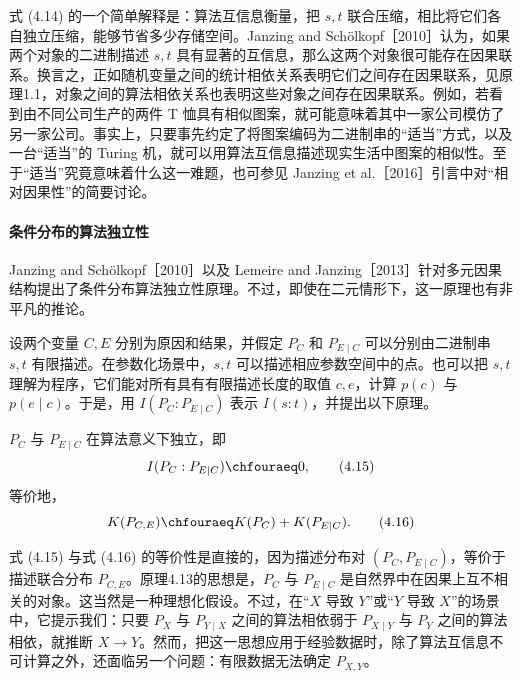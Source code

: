 式 (4.14) 的一个简单解释是：算法互信息衡量，把 $s,t$ 联合压缩，相比将它们各自独立压缩，能够节省多少存储空间。Janzing and Schölkopf［2010］认为，如果两个对象的二进制描述 $s,t$ 具有显著的互信息，那么这两个对象很可能存在因果联系。换言之，正如随机变量之间的统计相依关系表明它们之间存在因果联系，见原理1.1，对象之间的算法相依关系也表明这些对象之间存在因果联系。例如，若看到由不同公司生产的两件 T 恤具有相似图案，就可能意味着其中一家公司模仿了另一家公司。事实上，只要事先约定了将图案编码为二进制串的“适当”方式，以及一台“适当”的 Turing 机，就可以用算法互信息描述现实生活中图案的相似性。至于“适当”究竟意味着什么这一难题，也可参见 Janzing et al.［2016］引言中对“相对因果性”的简要讨论。

\paragraph{条件分布的算法独立性}
Janzing and Schölkopf［2010］以及 Lemeire and Janzing［2013］针对多元因果结构提出了条件分布算法独立性原理。不过，即使在二元情形下，这一原理也有非平凡的推论。

设两个变量 $C,E$ 分别为原因和结果，并假定 $P_C$ 和 $P_{E\mid C}$ 可以分别由二进制串 $s,t$ 有限描述。在参数化场景中，$s,t$ 可以描述相应参数空间中的点。也可以把 $s,t$ 理解为程序，它们能对所有具有有限描述长度的取值 $c,e$，计算 $p(c)$ 与 $p(e\mid c)$。于是，用 $I(P_C:P_{E\mid C})$ 表示 $I(s:t)$，并提出以下原理。

\begin{principle}[算法独立的条件分布]
$P_C$ 与 $P_{E\mid C}$ 在算法意义下独立，即
\begin{equation}
 I(P_C:P_{E\mid C})\chfouraeq0,
 \tag{4.15}
\end{equation}
等价地，
\begin{equation}
 K(P_{C,E})\chfouraeq K(P_C)+K(P_{E\mid C}).
 \tag{4.16}
\end{equation}
\end{principle}

式 (4.15) 与式 (4.16) 的等价性是直接的，因为描述分布对 $(P_C,P_{E\mid C})$，等价于描述联合分布 $P_{C,E}$。原理4.13的思想是，$P_C$ 与 $P_{E\mid C}$ 是自然界中在因果上互不相关的对象。这当然是一种理想化假设。不过，在“$X$ 导致 $Y$”或“$Y$ 导致 $X$”的场景中，它提示我们：只要 $P_X$ 与 $P_{Y\mid X}$ 之间的算法相依弱于 $P_{X\mid Y}$ 与 $P_Y$ 之间的算法相依，就推断 $X\to Y$。然而，把这一思想应用于经验数据时，除了算法互信息不可计算之外，还面临另一个问题：有限数据无法确定 $P_{X,Y}$。

